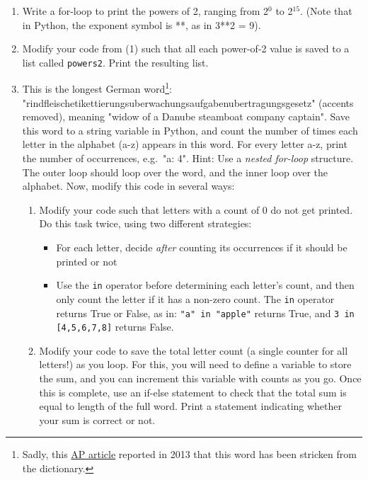 \documentclass{article}[12pt]
\newcommand{\code}[1]{\texttt{#1}}  %
\begin{document}
\begin{enumerate}[itemsep=5ex]
	\item Write a for-loop to print the powers of 2, ranging from 2$^0$ to 2$^{15}$. (Note that in Python, the exponent symbol is **, as in 3**2 = 9). 
	
	\item Modify your code from (1) such that all each power-of-2 value is saved to a list called \code{powers2}. Print the resulting list. 

	
	\item This is the longest German word\footnote{Sadly, this \href{http://www.salon.com/2013/06/03/law_change_spells_end_for_germanys_longest_word_ap/}{AP article} reported in 2013 that this word has been stricken from the dictionary.}: "rindfleischetikettierungsuberwachungsaufgabenubertragungsgesetz" (accents removed), meaning "widow of a Danube steamboat company captain". Save this word to a string variable in Python, and count the number of times each letter in the alphabet (a-z) appears in this word. For every letter a-z, print the number of occurrences, e.g.\ "a: 4". Hint: Use a \emph{nested for-loop} structure. The outer loop should loop over the word, and the inner loop over the alphabet.
	Now, modify this code in several ways:
	\begin{enumerate}[itemsep=2ex]
		\item Modify your code such that letters with a count of 0 do not get printed. Do this task twice, using two different strategies:
		\begin{itemize}
			\item For each letter, decide \emph{after} counting its occurrences if it should be printed or not
			\item Use the \code{in} operator before determining each letter's count, and then only count the letter if it has a non-zero count. The \code{in} operator returns True or False, as in: \code{"a" in "apple"} returns True, and \code{3 in [4,5,6,7,8]} returns False.
		\end{itemize}
		\item Modify your code to save the total letter count (a single counter for all letters!) as you loop. For this, you will need to define a variable to store the sum, and you can increment this variable with counts as you go. Once this is complete, use an if-else statement to check that the total sum is equal to length of the full word. Print a statement indicating whether your sum is correct or not.
	\end{enumerate}
	

\end{enumerate}
\end{document}
